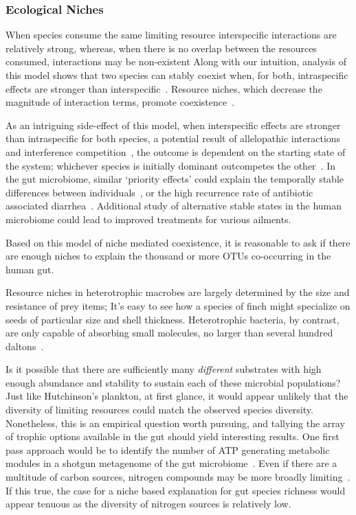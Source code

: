 \documentclass[12pt]{article}
\begin{document}
\subsubsection{Ecological Niches}
When species consume the same limiting resource
interspecific interactions are relatively strong,
whereas, when there is no overlap between the resources consumed,
interactions may be non-existent
Along with our intuition, analysis of this model shows that
two species can stably coexist when, for both,
intraspecific effects are stronger than interspecific~\citep{TODO}.
Resource niches,
which decrease the magnitude of interaction terms,
promote coexistence~\citep{TODO}.

As an intriguing side-effect of this model,
when interspecific effects are stronger than intraspecific for both
species,
a potential result of allelopathic interactions and
interference competition~\citep{Folt1981},
the outcome is dependent on the starting state of
the system;
whichever species is initially dominant outcompetes the other~\citep{TODO}.
In the gut microbiome, similar `priority effects' could explain the
temporally stable differences between individuals~\citep{Dethlefsen2006,Lahti2014},
or the high recurrence rate of antibiotic associated diarrhea~\citep{TODO}.
Additional study of alternative stable states in the human
microbiome could lead to improved treatments for various ailments.

Based on this model of niche mediated coexistence,
it is reasonable to ask if there are enough niches
to explain the thousand or more OTUs co-occurring in the human gut.

Resource niches in heterotrophic macrobes are largely
determined by the size and resistance of prey items;
It's easy to see how a species of finch might specialize on
seeds of particular size and shell thickness.
Heterotrophic bacteria, by contrast, are only capable of
absorbing small molecules,
no larger than several hundred daltons~\citep{TODO}.

Is it possible that there are sufficiently many \emph{different}
substrates with high enough abundance and stability
to sustain each of these microbial populations?
Just like Hutchinson's plankton,
at first glance, it would appear unlikely that the diversity
of limiting resources could match the observed species
diversity.
Nonetheless, this is an empirical question worth pursuing,
and tallying the array of trophic options available in the gut
should yield interesting results.
One first pass approach would be to identify the number of
ATP generating metabolic modules in a shotgun metagenome
of the gut microbiome~\citep{TODO}.
Even if there are a multitude of carbon sources,
nitrogen compounds may be more broadly limiting~\citep{TODO}.
If this true, the case for a niche based explanation for
gut species richness would appear tenuous
as the diversity of nitrogen sources is relatively low.
\end{document}
